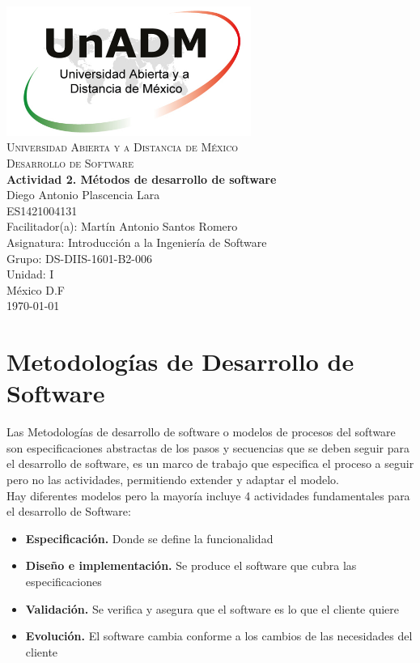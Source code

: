 \documentclass[spanish,12pt,letterpapper]{article}
\begin{document}
	\begin{titlepage}
		\begin{center}
			\includegraphics[width=0.6\textwidth]{../logoUnADM}~\\[1cm] 
			\textsc{Universidad Abierta y a Distancia de México}\\[0.8cm]
			\textsc{Desarrollo de Software}\\[1.8cm]
			
			\textbf{ \Large Actividad 2. Métodos de desarrollo de software}\\[3cm]
			
			Diego Antonio Plascencia Lara\\ ES1421004131 \\[0.4cm]
			Facilitador(a): Martín Antonio Santos Romero\\
			Asignatura: Introducción a la Ingeniería de Software\\
			Grupo: DS-DIIS-1601-B2-006 \\
			Unidad: I \\
			
			\vfill México D.F\\{\today}
			
		\end{center}
	\end{titlepage}
	
	\section{Metodologías de Desarrollo de Software}
	Las Metodologías de desarrollo de software o modelos de procesos del software son especificaciones abstractas de los pasos y secuencias que se deben seguir para el desarrollo de software, es un marco de trabajo que especifica el proceso a seguir pero no las actividades, permitiendo extender y adaptar el modelo.\\
	
	Hay diferentes modelos pero la mayoría incluye 4 actividades fundamentales para el desarrollo de Software:
	
	\begin{itemize}
	\item \textbf{Especificación.} Donde se define la funcionalidad
	\item \textbf{Diseño e implementación.} Se produce el software que cubra las especificaciones
	\item \textbf{Validación.} Se verifica y asegura que el software es lo que el cliente quiere
	\item \textbf{Evolución.} El software cambia conforme a los cambios de las necesidades del cliente
    \end{itemize}
    	 
\end{document}
